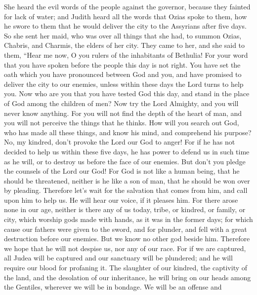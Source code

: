  She heard the evil words of the people against the
governor, because they fainted for lack of water; and Judith heard all
the words that Ozias spoke to them, how he swore to them that he would
deliver the city to the Assyrians after five days.  So
she sent her maid, who was over all things that she had, to summon
Ozias, Chabris, and Charmis, the elders of her city. 
They came to her, and she said to them, ``Hear me now, O you rulers of
the inhabitants of Bethulia! For your word that you have spoken before
the people this day is not right. You have set the oath which you have
pronounced between God and you, and have promised to deliver the city to
our enemies, unless within these days the Lord turns to help you.
 Now who are you that you have tested God this day, and
stand in the place of God among the children of men?  Now
try the Lord Almighty, and you will never know anything. 
For you will not find the depth of the heart of man, and you will not
perceive the things that he thinks. How will you search out God, who has
made all these things, and know his mind, and comprehend his purpose?
No, my kindred, don't provoke the Lord our God to anger! 
For if he has not decided to help us within these five days, he has
power to defend us in such time as he will, or to destroy us before the
face of our enemies.  But don't you pledge the counsels
of the Lord our God! For God is not like a human being, that he should
be threatened, neither is he like a son of man, that he should be won
over by pleading.  Therefore let's wait for the salvation
that comes from him, and call upon him to help us. He will hear our
voice, if it pleases him.  For there arose none in our
age, neither is there any of us today, tribe, or kindred, or family, or
city, which worship gods made with hands, as it was in the former days;
 for which cause our fathers were given to the sword, and
for plunder, and fell with a great destruction before our enemies.
 But we know no other god beside him. Therefore we hope
that he will not despise us, nor any of our race.  For if
we are captured, all Judea will be captured and our sanctuary will be
plundered; and he will require our blood for profaning it.
 The slaughter of our kindred, the captivity of the land,
and the desolation of our inheritance, he will bring on our heads among
the Gentiles, wherever we will be in bondage. We will be an offense and
